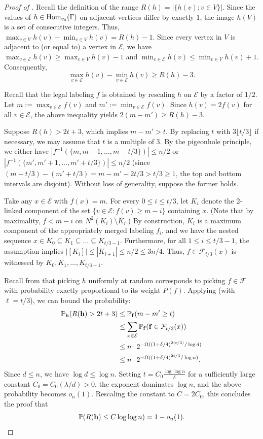 \documentclass{amsart}
\theoremstyle{definition}
\newcommand{\PP}{\mathbb{P}}
\newcommand{\cE}{\mathcal{E} }
\newcommand{\0}[0]{\emptyset}
\newcommand{\Hom}[0]{\mbox{\rm{Hom}}}
\begin{document}
\begin{proof}[Proof of ] 
    Recall the definition of the range $R(h)=|\{h(v):v \in V\}|$. Since the values of $h \in \Hom_{v_0}(\Gamma)$ on adjacent vertices differ by exactly 1, the image $h(V)$ is a set of consecutive integers. Thus, $\max_{v \in V} h(v) - \min_{v \in V} h(v) = R(h) - 1$. Since every vertex in $V$ is adjacent to (or equal to) a vertex in $\cE$, we have $\max_{v \in \cE} h(v) \ge \max_{v \in V} h(v) - 1$ and $\min_{v \in \cE} h(v) \le \min_{v \in V} h(v) + 1$. Consequently, 
\[
\max_{v \in \cE} h(v) - \min_{v \in \cE} h(v) \ge R(h) - 3.
\]

Recall that the legal labeling $f$ is obtained by rescaling $h$ on $\cE$ by a factor of $1/2$. Let $m:=\max_{v \in \cE}f(v)$ and $m':=\min_{v \in \cE}f(v)$. Since $h(v) = 2f(v)$ for all $v \in \cE$, the above inequality yields $2(m - m') \ge R(h) - 3$.

Suppose $R(h) > 2t + 3$, which implies $m-m'> t$. By replacing $t$ with $3\lfloor t/3 \rfloor$ if necessary, we may assume that $t$ is a multiple of 3. By the pigeonhole principle, we either have $|f^{-1}(\{m,m-1,\dots,m-t/3\})|\leq n/2$ or $|f^{-1}(\{m',m'+1,\dots,m'+t/3\})|\leq n/2$ (since $(m - t/3) - (m' + t/3) = m - m' - 2t/3 > t/3 \ge 1$, the top and bottom intervals are disjoint). Without loss of generality, suppose the former holds.

Take any $x\in \cE$ with $f(x)=m$. For every $0\leq i\leq t/3$, let $K_i$ denote the 2-linked component of the set $\{v \in \cE : f(v) \ge m-i\}$ containing $x$. (Note that by maximality, $f < m-i$ on $N^2(K_i) \setminus K_i$.) By construction, $K_i$ is a maximum component of the appropriately merged labeling $f_i$, and we have the nested sequence $x \in K_0 \subseteq K_1 \subseteq \dots \subseteq K_{t/3-1}$. Furthermore, for all $1\leq i\leq t/3-1$, the assumption implies $|[K_i]|\leq |K_{i+1}|\leq n/2\leq 3n/4$. Thus, $f\in\mathcal{F}_{t/3}(x)$ is witnessed by $K_0,K_1,\dots,K_{t/3-1}$.

Recall from  that picking $h$ uniformly at random corresponds to picking $f \in \mathcal{F}$ with probability exactly proportional to its weight $P(f)$. Applying  (with $\ell = t/3$), we can bound the probability:
\begin{align*}
\PP_{\bf h}(R({\bf h})>2t+3) &\leq \PP_{\bf f}(m - m' \ge t) \\
&\leq \sum_{x\in \cE}\PP_{\bf f}({\bf f}\in\mathcal{F}_{t/3}(x)) \\
&\leq n\cdot 2^{-\Omega((1+\delta/4)^{2(t/3)}/\log d)} \\
&\leq n\cdot 2^{-\Omega((1+\delta/4)^{2t/3}/\log n)}.
\end{align*}
Since $d \le n$, we have $\log d \le \log n$. Setting $t=C_0 \frac{\log\log n}{\delta}$ for a sufficiently large constant $C_0=C_0(\lambda/d)>0$, the exponent dominates $\log n$, and the above probability becomes $o_n(1)$. Rescaling the constant to $C = 2C_0$, this concludes the proof that
\[
\PP(R({\bf h})\leq C\log\log n)=1-o_n(1). \qedhere
\]
\end{proof}
\end{document}
